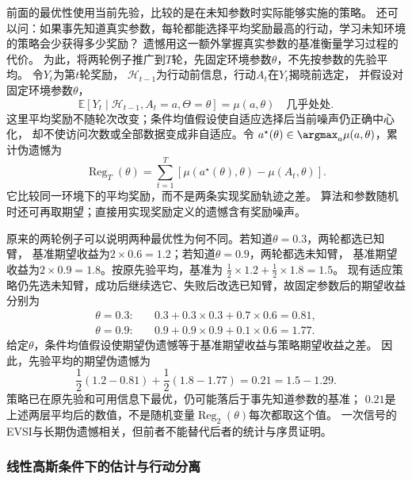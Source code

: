 前面的最优性使用当前先验，比较的是在未知参数时实际能够实施的策略。
还可以问：如果事先知道真实参数，每轮都能选择平均奖励最高的行动，学习未知环境的策略会少获得多少奖励？
遗憾用这一额外掌握真实参数的基准衡量学习过程的代价。
为此，将两轮例子推广到$T$轮，先固定环境参数$\theta$，不先按参数的先验平均。
令$Y_t$为第$t$轮奖励，
$\mathcal H_{t-1}$为行动前信息，行动$A_t$在$Y_t$揭晓前选定，
并假设对固定环境参数$\theta$，
\[
  \mathbb E[Y_t\mid\mathcal H_{t-1},A_t=a,\Theta=\theta]
  =\mu(a,\theta)\quad\text{几乎处处}.
\]
这里平均奖励不随轮次改变；条件均值假设使自适应选择后当前噪声仍正确中心化，
却不使访问次数或全部数据变成非自适应。令
$a^\star(\theta)\in\argmax_a\mu(a,\theta)$，累计伪遗憾为
\[
  \operatorname{Reg}_T(\theta)
  =\sum_{t=1}^T[\mu(a^\star(\theta),\theta)-\mu(A_t,\theta)].
\]
它比较同一环境下的平均奖励，而不是两条实现奖励轨迹之差。
算法和参数随机时还可再取期望；直接用实现奖励定义的遗憾含有奖励噪声。

原来的两轮例子可以说明两种最优性为何不同。若知道$\theta=0.3$，两轮都选已知臂，
基准期望收益为$2\times0.6=1.2$；若知道$\theta=0.9$，两轮都选未知臂，
基准期望收益为$2\times0.9=1.8$。按原先验平均，基准为
$\tfrac12\times1.2+\tfrac12\times1.8=1.5$。
现有适应策略仍先选未知臂，成功后继续选它、失败后改选已知臂，故固定参数后的期望收益分别为
\begin{align*}
  \theta=0.3:\quad&0.3+0.3\times0.3+0.7\times0.6=0.81,\\
  \theta=0.9:\quad&0.9+0.9\times0.9+0.1\times0.6=1.77.
\end{align*}
给定$\theta$，条件均值假设使期望伪遗憾等于基准期望收益与策略期望收益之差。
因此，先验平均的期望伪遗憾为
\[
  \frac12(1.2-0.81)+\frac12(1.8-1.77)
  =0.21=1.5-1.29.
\]
策略已在原先验和可用信息下最优，仍可能落后于事先知道参数的基准；
$0.21$是上述两层平均后的数值，不是随机变量$\operatorname{Reg}_2(\theta)$每次都取这个值。
一次信号的EVSI与长期伪遗憾相关，但前者不能替代后者的统计与序贯证明。

\subsubsection{线性高斯条件下的估计与行动分离}

